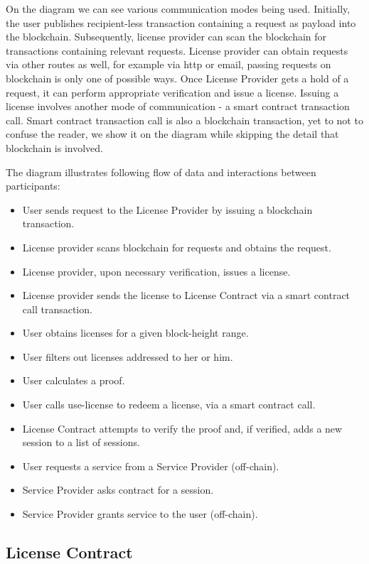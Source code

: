On the diagram we can see various communication modes being used. Initially, the user publishes recipient-less transaction containing a request as payload into the blockchain. Subsequently, license provider can scan the blockchain for transactions containing relevant requests. License provider can obtain requests via other routes as well, for example via http or email, passing requests on blockchain is only one of possible ways. Once License Provider gets a hold of a request, it can perform appropriate verification and issue a license. Issuing a license involves another mode of communication - a smart contract transaction call. Smart contract transaction call is also a blockchain transaction, yet to not to confuse the reader, we show it on the diagram while skipping the detail that blockchain is involved.

The diagram illustrates following flow of data and interactions between participants:

\begin{itemize}%
	\item User sends request to the License Provider by issuing a blockchain transaction.
	\item License provider scans blockchain for requests and obtains the request.
	\item License provider, upon necessary verification, issues a license.
	\item License provider sends the license to License Contract via a smart contract call transaction.
	\item User obtains licenses for a given block-height range.
	\item User filters out licenses addressed to her or him.
	\item User calculates a proof.
	\item User calls use-license to redeem a license, via a smart contract call.
	\item License Contract attempts to verify the proof and, if verified, adds a new session to a list of sessions.
	\item User requests a service from a Service Provider (off-chain).
	\item Service Provider asks contract for a session.
	\item Service Provider grants service to the user (off-chain).
\end{itemize}


\subsection{License Contract}

